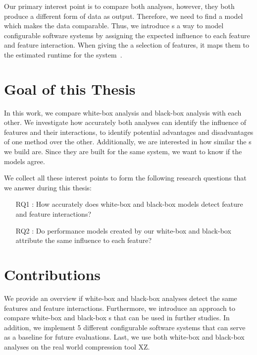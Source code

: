 Our primary interest point is to compare both analyses, however, they both produce a different form of data as output. 
Therefore, we need to find a model which makes the data comparable. 
Thus, we introduce {\perfInfluenceModel}s a way to model configurable software systems by assigning the expected influence to each feature 
and feature interaction. When giving the {\perfInfluenceModel} a selection of features, it maps them to the estimated runtime for the system~\cite{Performance-influence-models-for-highly-configurable-systems}. 

\section{Goal of this Thesis}
In this work, we compare white-box analysis and black-box analysis with each other. 
We investigate how accurately both analyses can identify the influence of features and their interactions,
to identify potential advantages and disadvantages of one method over the other. 
Additionally, we are interested in how similar the {\perfInfluenceModel}s we build are. 
Since they are built for the same system, we want to know if the models agree.

We collect all these interest points to form the following research questions that we answer during this thesis: 

\begin{itemize}\label{researchQuestions}
    \item[RQ1]: How accurately does white-box and black-box models detect feature and feature interactions? 
    \item[RQ2]: Do performance models created by our white-box and black-box attribute the same influence to each feature?
\end{itemize}

\section{Contributions}
We provide an overview if white-box and black-box analyses detect the same features and feature interactions.
Furthermore, we introduce an approach to compare white-box and black-box {\perfInfluenceModel}s that can be used in 
further studies. In addition, we implement 5 different configurable software systems that can serve as a baseline for future evaluations.
Last, we use both white-box and black-box analyses on the real world compression tool \textsc{XZ}.

